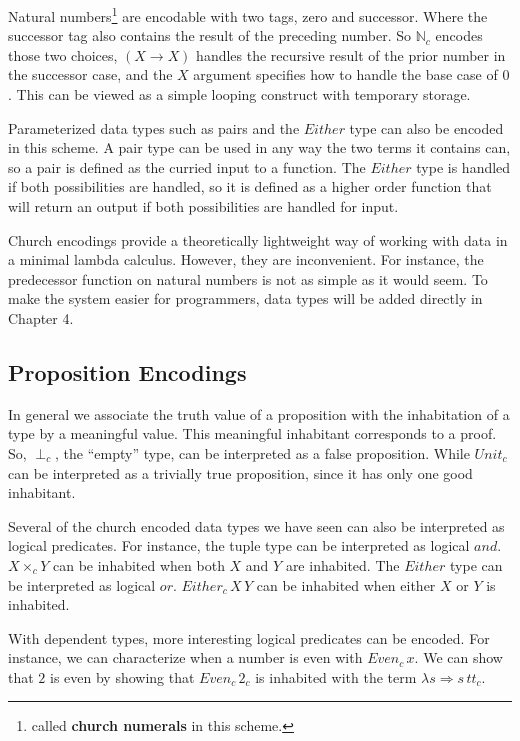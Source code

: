 Natural numbers\footnote{called \textbf{church numerals} in this scheme.} are encodable with two tags, zero and successor.
Where the successor tag also contains the result of the preceding number.
So $\mathbb{N}_{c}$ encodes those two choices, $(X\rightarrow X)$ handles the recursive result of the prior number in the successor case, and the $X$ argument specifies how to handle the base case of $0$.
This can be viewed as a simple looping construct with temporary storage.

Parameterized data types such as pairs and the $Either$ type can also be encoded in this scheme.
A pair type can be used in any way the two terms it contains can, so a pair is defined as the curried input to a function.
The $Either$ type is handled if both possibilities are handled, so it is defined as a higher order function that will return an output if both possibilities are handled for input.


Church encodings provide a theoretically lightweight way of working with data in a minimal lambda calculus.
However, they are inconvenient.
For instance, the predecessor function on natural numbers is not as simple as it would seem.
To make the system easier for programmers, data types will be added directly in Chapter 4.

\subsection{Proposition Encodings}

In general we associate the truth value of a proposition with the inhabitation of a type by a meaningful value.
This meaningful inhabitant corresponds to a proof.
So, $\perp_{c}$, the ``empty'' type, can be interpreted as a false proposition.
While $Unit_{c}$ can be interpreted as a trivially true proposition, since it has only one good inhabitant.

Several of the church encoded data types we have seen can also be interpreted as logical predicates.
For instance, the tuple type can be interpreted as logical $and$.
$X\times_{c}Y$ can be inhabited when both $X$ and $Y$ are inhabited.
The $Either$ type can be interpreted as logical $or$.
$Either_{c}\,X\,Y$ can be inhabited when either $X$ or $Y$ is inhabited.

With dependent types, more interesting logical predicates can be encoded.
For instance, we can characterize when a number is even with $Even_{c}\,x$.
We can show that $2$ is even by showing that $Even_{c}\,2_{c}$ is inhabited with the term $\lambda s\Rightarrow s\,tt_{c}$.

